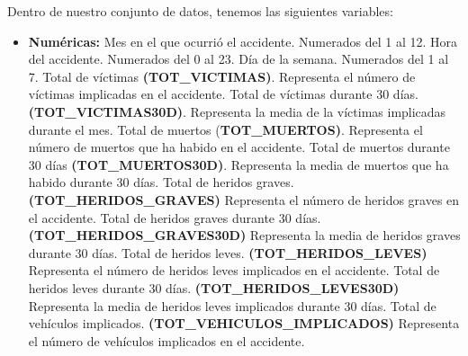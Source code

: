 	\vspace{0.06in}
	Dentro de nuestro conjunto de datos, tenemos las siguientes variables:
	\begin{itemize}
		\item \textbf{Numéricas:}
			\subitem Mes en el que ocurrió el accidente. Numerados del 1 al 12.
			\subitem Hora del accidente. Numerados del 0 al 23.
			\subitem Día de la semana. Numerados del 1 al 7.
			\subitem Total de víctimas \textbf{(TOT\_VICTIMAS)}. Representa el número de víctimas implicadas en el accidente.
			\subitem Total de víctimas durante 30 días. \textbf{(TOT\_VICTIMAS30D)}. Representa la media de la víctimas implicadas durante el mes.
			\subitem Total de muertos (\textbf{TOT\_MUERTOS)}. Representa el número de muertos que ha habido en el accidente.
			\subitem Total de muertos durante 30 días \textbf{(TOT\_MUERTOS30D)}. Representa la media de muertos que ha habido durante 30 días.
			\subitem Total de heridos graves. \textbf{(TOT\_HERIDOS\_GRAVES)} Representa el número de heridos graves en el accidente.
			\subitem Total de heridos graves durante 30 días. \textbf{(TOT\_HERIDOS\_GRAVES30D)} Representa la media de heridos graves durante 30 días.
			\subitem Total de heridos leves. \textbf{(TOT\_HERIDOS\_LEVES)} Representa el número de heridos leves implicados en el accidente.
			\subitem Total de heridos leves durante 30 días. \textbf{(TOT\_HERIDOS\_LEVES30D)} Representa la media de heridos leves implicados durante 30 días.
			\subitem Total de vehículos implicados. \textbf{(TOT\_VEHICULOS\_IMPLICADOS)} Representa el número de vehículos implicados en el accidente.
		

\end{itemize}
